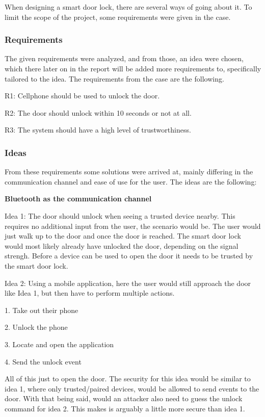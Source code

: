 When designing a smart door lock, there are several ways of going about it.
To limit the scope of the project, some requirements were given in the case.

\subsubsection{Requirements}
The given requirements were analyzed, and from those, an idea were chosen, which there later on in the report will be added more requirements to, specifically tailored to the idea.
The requirements from the case are the following.
\newline

R1: Cellphone should be used to unlock the door.

R2: The door should unlock within 10 seconds or not at all.

R3: The system should have a high level of trustworthiness.

\subsubsection{Ideas}
From these requirements some solutions were arrived at, mainly differing in the communication channel and ease of use for the user.
The ideas are the following:

\textbf{Bluetooth as the communication channel}

Idea 1: The door should unlock when seeing a trusted device nearby.
This requires no additional input from the user, the scenario would be. The user would just walk up to the door and once the door is reached.
The smart door lock would most likely already have unlocked the door, depending on the signal strengh.
Before a device can be used to open the door it needs to be trusted by the smart door lock.

Idea 2: Using a mobile application, here the user would still approach the door like Idea 1, but then have to perform multiple actions.
\newline

1. Take out their phone

2. Unlock the phone

3. Locate and open the application

4. Send the unlock event

All of this just to open the door.
The security for this idea would be similar to idea 1, where only trusted/paired devices, would be allowed to send events to the door. With that being said, would an attacker also need to guess the unlock command for idea 2. This makes is arguably a little more secure than idea 1.

